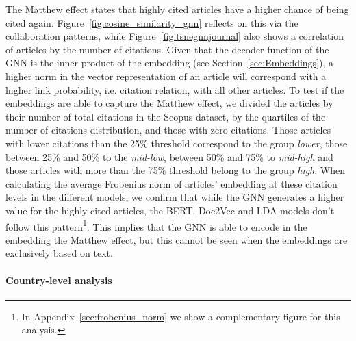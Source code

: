 \documentclass[smallextended]{svjour3}
\begin{document}
	The Matthew effect \parencite{merton_sociology_1974} states that highly cited articles have a higher chance of being cited again. Figure~\ref{fig:cosine_similarity_gnn} reflects on this via the collaboration patterns, while Figure~\ref{fig:tsnegnnjournal} also shows a correlation of articles by the number of citations. Given that the decoder function of the GNN is the inner product of the embedding (see Section~\ref{sec:Embeddings}), a higher norm in the vector representation of an article will correspond with a higher link probability, i.e. citation relation, with all other articles. To test if the embeddings are able to capture the Matthew effect, we divided the articles by their number of total citations in the Scopus dataset, by the quartiles of the number of citations distribution, and those with zero citations.  Those articles with lower citations than the 25\% threshold correspond to the group \textit{lower}, those between 25\% and 50\% to the \textit{mid-low}, between 50\% and 75\% to \textit{mid-high} and those articles with more than the 75\%  threshold belong to the group \textit{high}. When calculating the average Frobenius norm of articles' embedding at these citation levels in the different models, we confirm that while the GNN generates a higher value for the highly cited articles, the BERT, Doc2Vec and LDA models don't follow this pattern\footnote{In Appendix~\ref{sec:frobenius_norm} we show a complementary figure for this analysis.}. This implies that the GNN is able to encode in the embedding the Matthew effect, but this cannot be seen when the embeddings are exclusively based on text. 
	
	\paragraph{\textbf{Country-level analysis}}
\end{document}

